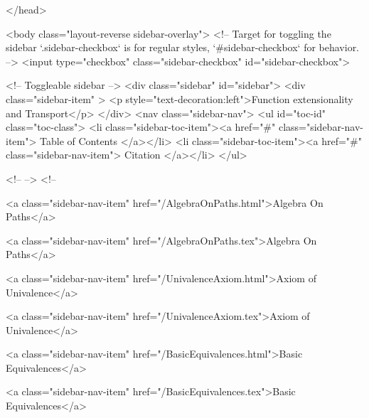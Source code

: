   
</head>




  <body class="layout-reverse sidebar-overlay">
    <!-- Target for toggling the sidebar `.sidebar-checkbox` is for regular
     styles, `#sidebar-checkbox` for behavior. -->
<input type="checkbox" class="sidebar-checkbox" id="sidebar-checkbox">

<!-- Toggleable sidebar -->
<div class="sidebar" id="sidebar">
  <div class="sidebar-item" >
    <p style="text-decoration:left">Function extensionality and Transport</p>
  </div>
  <nav class="sidebar-nav">
    <ul id="toc-id" class="toc-class">
  <li class="sidebar-toc-item"><a href="#" class="sidebar-nav-item"> Table of Contents </a></li>
  <li class="sidebar-toc-item"><a href="#" class="sidebar-nav-item"> Citation </a></li>
</ul>


    <!--  -->
    <!-- 
      
    
      
    
      
    
      
    
      
        
      
    
      
        
          <a class="sidebar-nav-item" href="/AlgebraOnPaths.html">Algebra On Paths</a>
        
      
    
      
        
          <a class="sidebar-nav-item" href="/AlgebraOnPaths.tex">Algebra On Paths</a>
        
      
    
      
        
          <a class="sidebar-nav-item" href="/UnivalenceAxiom.html">Axiom of Univalence</a>
        
      
    
      
        
          <a class="sidebar-nav-item" href="/UnivalenceAxiom.tex">Axiom of Univalence</a>
        
      
    
      
        
          <a class="sidebar-nav-item" href="/BasicEquivalences.html">Basic Equivalences</a>
        
      
    
      
        
          <a class="sidebar-nav-item" href="/BasicEquivalences.tex">Basic Equivalences</a>
        
